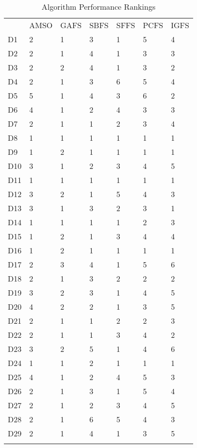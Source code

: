 \begin{table}
\caption{Algorithm Performance Rankings}
\label{tbl:algorithm:rank}
\begin{tabular}{lllllll}
\noalign{\smallskip}\hline\noalign{\smallskip}
&AMSO&GAFS&SBFS&SFFS&PCFS&IGFS\\
\noalign{\smallskip}\hline
D1&2&1&3&1&5&4\\
D2&2&1&4&1&3&3\\
D3&2&2&4&1&3&2\\
D4&2&1&3&6&5&4\\
D5&5&1&4&3&6&2\\
D6&4&1&2&4&3&3\\
D7&2&1&1&2&3&4\\
D8&1&1&1&1&1&1\\
D9&1&2&1&1&1&1\\
D10&3&1&2&3&4&5\\
D11&1&1&1&1&1&1\\
D12&3&2&1&5&4&3\\
D13&3&1&3&2&3&1\\
D14&1&1&1&1&2&3\\
D15&1&2&1&3&4&4\\
D16&1&2&1&1&1&1\\
D17&2&3&4&1&5&6\\
D18&2&1&3&2&2&2\\
D19&3&2&3&1&4&5\\
D20&4&2&2&1&3&5\\
D21&2&1&1&2&2&3\\
D22&2&1&1&3&4&2\\
D23&3&2&5&1&4&6\\
D24&1&1&2&1&1&1\\
D25&4&1&2&4&5&3\\
D26&2&1&3&1&5&4\\
D27&2&1&2&3&4&5\\
D28&2&1&6&5&4&3\\
D29&2&1&4&1&3&5\\
\noalign{\smallskip}\hline
\end{tabular}
\end{table}
